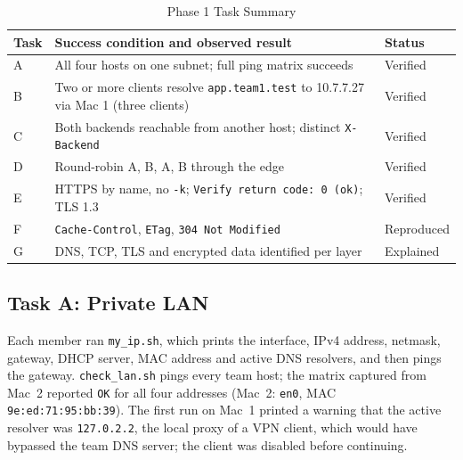 \documentclass[conference,a4paper]{IEEEtran}
\newcommand{\code}[1]{\texttt{#1}}
\begin{document}
\begin{table}[t]
\caption{Phase 1 Task Summary}
\label{tab:p1}
\centering\footnotesize
\begin{tabularx}{\columnwidth}{@{}P{0.45cm}LP{1.35cm}@{}}
\toprule
\textbf{Task} & \textbf{Success condition and observed result} & \textbf{Status}\\
\midrule
A & All four hosts on one subnet; full ping matrix succeeds & Verified\\
B & Two or more clients resolve \code{app.team1.test} to 10.7.7.27 via Mac 1 (three clients) & Verified\\
C & Both backends reachable from another host; distinct \code{X-Backend} & Verified\\
D & Round-robin A, B, A, B through the edge & Verified\\
E & HTTPS by name, no \code{-k}; \code{Verify return code: 0 (ok)}; TLS 1.3 & Verified\\
F & \code{Cache-Control}, \code{ETag}, \code{304 Not Modified} & Reproduced\\
G & DNS, TCP, TLS and encrypted data identified per layer & Explained\\
\bottomrule
\end{tabularx}
\end{table}

\subsection{Task A: Private LAN}
Each member ran \code{my\_ip.sh}, which prints the interface, IPv4 address, netmask, gateway, DHCP
server, MAC address and active DNS resolvers, and then pings the gateway. \code{check\_lan.sh}
pings every team host; the matrix captured from Mac~2 reported \code{OK} for all four addresses
(Mac~2: \code{en0}, MAC \code{9e:ed:71:95:bb:39}). The first run on Mac~1 printed a warning that
the active resolver was \code{127.0.2.2}, the local proxy of a VPN client, which would have
bypassed the team DNS server; the client was disabled before continuing.
\end{document}
